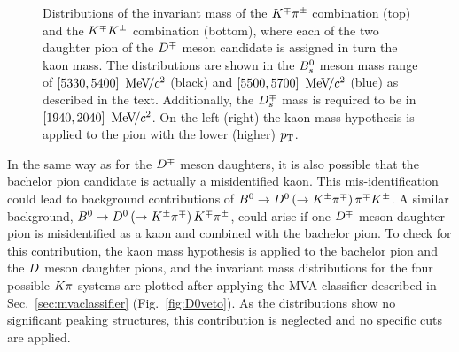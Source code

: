 \begin{figure}[t]
\begin{center}
	\end{center}
        \vspace{-2mm}
	\caption{Distributions of the invariant mass of the $K^\mp\pi^\pm$ combination (top) and
	the $K^\mp K^\pm$ combination (bottom), where each of the two daughter pion of the
	$D^\mp$ meson candidate is assigned in turn the kaon mass. The distributions are shown in the $B^0_s$ meson mass range of $[5330,5400]~{\mathrm{\,Me\kern -0.1em V\!/}c^2}$
	(black) and $[5500,5700]~{\mathrm{\,Me\kern -0.1em V\!/}c^2}$ (blue) as described in the text.
	Additionally, the $D^{\mp}_s$ mass is required to be in
	$[1940,2040]~{\mathrm{\,Me\kern -0.1em V\!/}c^2}$. On the left (right) the kaon mass
	hypothesis is applied to the pion with the lower (higher) $\mbox{$p_{\rm T}$}$.}
	\label{fig:KstarAndPhi}
\end{figure}
%
In the same way as for the $D^\mp$ meson daughters, it is also possible that the
bachelor pion candidate is actually a misidentified kaon. This mis-identification could lead
to background contributions of
\mbox{$B^0\rightarrow D^0\left(\rightarrow K^\pm\pi^\mp\right)\pi^\mp K^\pm$}. A similar background, \mbox{$B^0\rightarrow D^0\left(\rightarrow K^\pm\pi^\mp\right)K^\mp\pi^\pm$},
could arise if one $D^\mp$ meson daughter pion is misidentified as a
kaon and combined with the bachelor pion. To check for this contribution, the
kaon mass hypothesis is applied to the bachelor pion and the $D$ meson daughter
pions, and the invariant mass distributions for the four possible $K\pi$
systems are plotted after applying the MVA classifier described in Sec.~\ref{sec:mvaclassifier} (Fig.~\ref{fig:D0veto}). As the
distributions show no significant peaking structures, this
contribution is neglected and no specific
cuts are applied.
%
